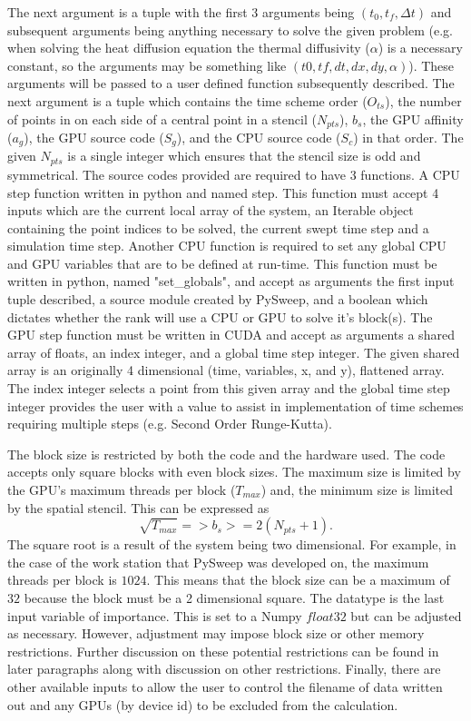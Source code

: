 \documentclass[review]{elsarticle}
\begin{document}
\par
The next argument is a tuple with the first 3 arguments being $(t_0,t_f,\Delta t)$ and subsequent arguments being anything necessary to solve the given problem (e.g. when solving the heat diffusion equation the thermal diffusivity ($\alpha$) is a necessary constant, so the arguments may be something like $(t0,tf,dt, dx, dy, \alpha)$). These arguments will be passed to a user defined function subsequently described. The next argument is a tuple which contains the time scheme order ($O_{ts}$), the number of points in on each side of a central point in a stencil ($N_{pts}$), $b_s$, the GPU affinity ($a_g$), the GPU source code ($S_g$), and the CPU source code ($S_c$) in that order. The given $N_{pts}$ is a single integer which ensures that the stencil size is odd and symmetrical. The source codes provided are required to have 3 functions. A CPU step function written in python and named step. This function must accept 4 inputs which are the current local array of the system, an Iterable object containing the point indices to be solved, the current swept time step and a simulation time step. Another CPU function is required to set any global CPU and GPU variables that are to be defined at run-time. This function must be written in python, named "set\_globals", and accept as arguments the first input tuple described, a source module created by PySweep, and a boolean which dictates whether the rank will use a CPU or GPU to solve it's block(s). The GPU step function must be written in CUDA and accept as arguments a shared array of floats, an index integer, and a global time step integer. The given shared array is an originally 4 dimensional (time, variables, x, and y), flattened array. The index integer selects a point from this given array and the global time step integer provides the user with a value to assist in implementation of time schemes requiring multiple steps (e.g. Second Order Runge-Kutta).

\par
The block size is restricted by both the code and the hardware used. The code accepts only square blocks with even block sizes. The maximum size is limited by the GPU's maximum threads per block ($T_{max}$) and, the minimum size is limited by the spatial stencil. This can be expressed as
\begin{equation}
\sqrt{T_{max}} =>  b_s >= 2(N_{pts}+1).
\end{equation}
The square root is a result of the system being two dimensional. For example, in the case of the work station that PySweep was developed on, the maximum threads per block is $1024$. This means that the block size can be a maximum of $32$ because the block must be a 2 dimensional square. The datatype is the last input variable of importance. This is set to a Numpy $float32$ but can be adjusted as necessary. However, adjustment may impose block size or other memory restrictions. Further discussion on these potential restrictions can be found in later paragraphs along with discussion on other restrictions. Finally, there are other available inputs to allow the user to control the filename of data written out and any GPUs (by device id) to be excluded from the calculation.
\end{document}
